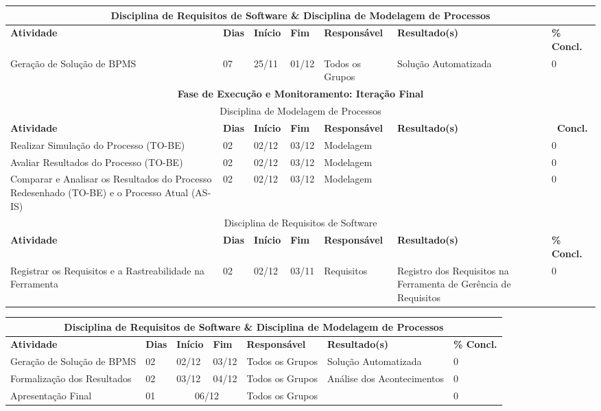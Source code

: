 \begin{landscape}
\begin{center}
\begin{tabular}{|m{6cm}|m{1cm}|m{1cm}|m{1cm}|m{4cm}|m{6cm}|m{2cm}|}
			\multicolumn{7}{|c|}{Disciplina de Requisitos de Software \& Disciplina de Modelagem de Processos} \\ \hline
			\textbf{Atividade} & \textbf{Dias} & \textbf{Início} & \textbf{Fim} & \textbf{Responsável} & \textbf{Resultado(s)} & \textbf{\% Concl.} \\ \hline
			Geração de Solução de BPMS & 07 & 25/11 & 01/12 & Todos os Grupos & Solução Automatizada & 0 \\ \hline
			\multicolumn{7}{|c|}{\textbf{Fase de Execução e Monitoramento: Iteração Final}} \\
			\hline
			\multicolumn{7}{|c|}{Disciplina de Modelagem de Processos} \\
			\hline
			\textbf{Atividade} & \textbf{Dias} & \textbf{Início} & \textbf{Fim} & \textbf{Responsável} & \textbf{Resultado(s)} & \textbf{\ Concl.} \\ \hline
			Realizar Simulação do Processo (TO-BE) & 02 & 02/12 & 03/12 & Modelagem & & 0 \\ \hline
			Avaliar Resultados do Processo (TO-BE) & 02 & 02/12 & 03/12 & Modelagem & & 0 \\ \hline
			Comparar e Analisar os Resultados do Processo Redesenhado (TO-BE) e o Processo Atual (AS-IS) & 02 & 02/12 & 03/12 & Modelagem & & 0 \\ \hline
			\multicolumn{7}{|c|}{Disciplina de Requisitos de Software} \\
			\hline
			\textbf{Atividade} & \textbf{Dias} & \textbf{Início} & \textbf{Fim} & \textbf{Responsável} & \textbf{Resultado(s)} & \textbf{\% Concl.} \\ \hline
			Registrar os Requisitos e a Rastreabilidade na Ferramenta & 02 & 02/12 & 03/11 & Requisitos & Registro dos Requisitos na Ferramenta de Gerência de Requisitos & 0 \\ \hline
			\end{tabular}
		\end{center}
		\begin{center}
			\begin{tabular}{|m{6cm}|m{1cm}|m{1cm}|m{1cm}|m{4cm}|m{6cm}|m{2cm}|}
			\hline
			\multicolumn{7}{|c|}{Disciplina de Requisitos de Software \& Disciplina de Modelagem de Processos} \\ \hline
			\textbf{Atividade} & \textbf{Dias} & \textbf{Início} & \textbf{Fim} & \textbf{Responsável} & \textbf{Resultado(s)} & \textbf{\% Concl.} \\ \hline
			Geração de Solução de BPMS & 02 & 02/12 & 03/12 & Todos os Grupos & Solução Automatizada & 0 \\ \hline
			Formalização dos Resultados & 02 & 03/12 & 04/12 & Todos os Grupos & Análise dos Acontecimentos & 0 \\ \hline
			Apresentação Final & 01 & \multicolumn{2}{c|}{06/12} & Todos os Grupos & & 0 \\ \hline
			\end{tabular}
		\end{center}
	\end{landscape}